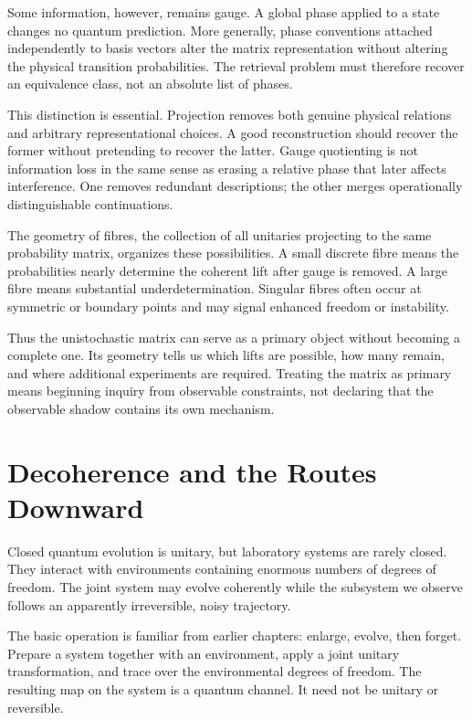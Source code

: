 \documentclass[12pt,openany]{book}
\begin{document}
Some information, however, remains gauge. A global phase applied to a state changes no quantum prediction. More generally, phase conventions attached independently to basis vectors alter the matrix representation without altering the physical transition probabilities. The retrieval problem must therefore recover an equivalence class, not an absolute list of phases.

This distinction is essential. Projection removes both genuine physical relations and arbitrary representational choices. A good reconstruction should recover the former without pretending to recover the latter. Gauge quotienting is not information loss in the same sense as erasing a relative phase that later affects interference. One removes redundant descriptions; the other merges operationally distinguishable continuations.

The geometry of fibres, the collection of all unitaries projecting to the same probability matrix, organizes these possibilities. A small discrete fibre means the probabilities nearly determine the coherent lift after gauge is removed. A large fibre means substantial underdetermination. Singular fibres often occur at symmetric or boundary points and may signal enhanced freedom or instability.

Thus the unistochastic matrix can serve as a primary object without becoming a complete one. Its geometry tells us which lifts are possible, how many remain, and where additional experiments are required. Treating the matrix as primary means beginning inquiry from observable constraints, not declaring that the observable shadow contains its own mechanism.

\chapter{Decoherence and the Routes Downward}
Closed quantum evolution is unitary, but laboratory systems are rarely closed. They interact with environments containing enormous numbers of degrees of freedom. The joint system may evolve coherently while the subsystem we observe follows an apparently irreversible, noisy trajectory.

The basic operation is familiar from earlier chapters: enlarge, evolve, then forget. Prepare a system together with an environment, apply a joint unitary transformation, and trace over the environmental degrees of freedom. The resulting map on the system is a quantum channel. It need not be unitary or reversible.
\end{document}
